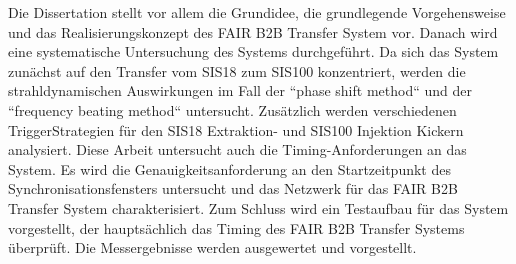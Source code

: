 Die Dissertation stellt vor allem die Grundidee, die grundlegende Vorgehensweise und das Realisierungskonzept des FAIR B2B Transfer System vor. Danach wird eine systematische Untersuchung des Systems durchgeführt. Da sich das System zun\"achst auf den Transfer vom SIS18 zum SIS100 konzentriert, werden die strahldynamischen Auswirkungen im Fall der ``phase shift method`` und der ``frequency beating method`` untersucht. Zus\"atzlich werden verschiedenen TriggerStrategien f\"ur den SIS18 Extraktion- und SIS100 Injektion Kickern analysiert. Diese Arbeit untersucht auch die Timing-Anforderungen an das System. Es wird die Genauigkeitsanforderung an den Startzeitpunkt des Synchronisationsfensters untersucht und das Netzwerk für das FAIR B2B Transfer System charakterisiert. Zum
Schluss wird ein Testaufbau f\"ur das System vorgestellt, der haupts\"achlich das Timing des FAIR B2B Transfer Systems \"uberpr\"uft. Die Messergebnisse werden ausgewertet und vorgestellt.

